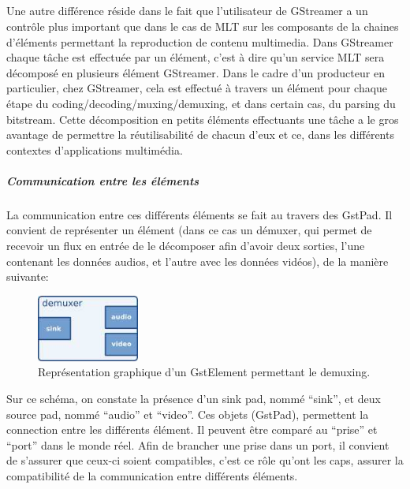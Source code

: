 \subparagraph{}

Une autre différence réside dans le fait que l'utilisateur de
GStreamer a un contrôle plus important que dans le cas de MLT sur
les composants de la chaines d'éléments permettant la reproduction de
contenu multimedia.  Dans GStreamer chaque tâche est effectuée par un
élément, c'est à dire qu'un service MLT sera décomposé en plusieurs
élément GStreamer. Dans le cadre d'un producteur en particulier, chez
GStreamer, cela est effectué à travers un élément pour chaque étape
du coding/decoding/muxing/demuxing, et dans certain cas, du parsing du
bitstream. Cette décomposition en petits éléments effectuants une tâche
a le gros avantage de permettre la réutilisabilité de chacun d'eux et
ce, dans les différents  contextes d'applications multimédia.

\subparagraph{Communication entre les éléments}

\subparagraph{}

La communication entre ces différents éléments se fait au travers des
GstPad. Il convient de représenter un élément (dans ce cas un démuxer,
qui permet de recevoir un flux en entrée de le décomposer afin d'avoir
deux sorties, l'une contenant les données audios, et l'autre avec les
données vidéos), de la manière suivante:

\begin{figure} [H]

  \begin{center}

    \includegraphics[width=0.30\textwidth]{images/gstdemuxer}

  \end{center}

  \caption{Représentation graphique d'un GstElement permettant le
  demuxing.}

  \label{Yes}

\end{figure}

Sur ce schéma, on constate la présence d'un sink pad, nommé ``sink'',
et deux source pad, nommé ``audio'' et ``video''. Ces objets (GstPad),
permettent la connection entre les différents élément. Il peuvent être
comparé au ``prise'' et ``port'' dans le monde réel.  Afin de brancher
une prise dans un port, il convient de s'assurer que ceux-ci soient
compatibles, c'est ce rôle qu'ont les caps, assurer la compatibilité
de la communication entre différents éléments.

